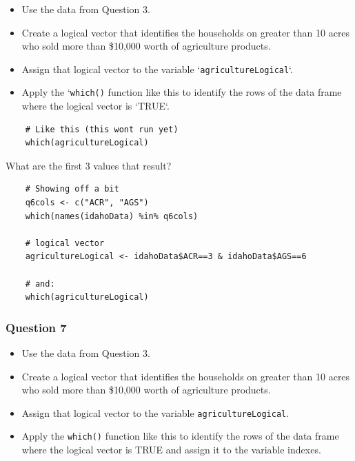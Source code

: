 \documentclass{beamer}
\begin{document}
\begin{frame}
\begin{itemize}
	\item Use the data from Question 3. 
	\item Create a logical vector that identifies the households on greater than 10 acres who sold more than \$10,000 worth of agriculture products. 
	\item Assign that logical vector to the variable `\texttt{agricultureLogical}`. 
	\item Apply the `\texttt{which()} function like this to identify the rows of the data frame where the logical vector is `TRUE`.
\end{itemize}

\end{frame}
\begin{frame}[fragile]
\begin{framed} 
	\begin{verbatim}
	# Like this (this wont run yet)
	which(agricultureLogical) 
	\end{verbatim}
\end{framed} 
\end{frame}
\begin{frame}[fragile]
What are the first 3 values that result?

\begin{framed} \begin{verbatim}
	# Showing off a bit
	q6cols <- c("ACR", "AGS")
	which(names(idahoData) %in% q6cols)  
	
	# logical vector
	agricultureLogical <- idahoData$ACR==3 & idahoData$AGS==6
	
	# and:
	which(agricultureLogical) 
	\end{verbatim}\end{framed} 

\end{frame}
\begin{frame}
	
\frametitle{Question 7}

\begin{itemize}
	\item Use the data from Question 3. 
	\item Create a logical vector that identifies the households on greater than 10 acres who
	sold more than \$10,000 worth of agriculture products. 
	\item Assign that logical vector to the variable \texttt{agricultureLogical}. 
	\item Apply the \texttt{which()} function like this to identify the rows of the 
	data frame where the logical vector is TRUE and assign it to the variable indexes. 
\end{itemize}

\end{frame}
\end{document}
